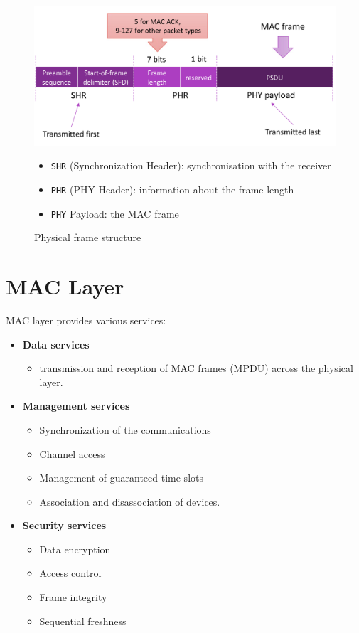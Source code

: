 \begin{figure}[htbp]
   \centering
   \includegraphics{images/802_physicalframe.png}
   \caption{Physical frame structure}
   \label{fig:802_physicalframe}

   \begin{itemize}
      \item \texttt{SHR} (Synchronization Header): synchronisation with the receiver
      \item \texttt{PHR} (PHY Header): information about the frame length
      \item \texttt{PHY} Payload: the MAC frame
   \end{itemize}
\end{figure}
   
\section*{MAC Layer}

MAC layer provides various services:
\begin{itemize}
   \item \textbf{Data services}
   \begin{itemize}
      \item transmission and reception of MAC frames (MPDU)
      across the physical layer.
   \end{itemize}
   \item \textbf{Management services}
   \begin{itemize}
      \item Synchronization of the communications
      \item Channel access
      \item Management of guaranteed time slots
      \item Association and disassociation of devices.
   \end{itemize}
   \item \textbf{Security services}
   \begin{itemize}
      \item Data encryption
      \item Access control
      \item Frame integrity
      \item Sequential freshness
   \end{itemize}
\end{itemize}


